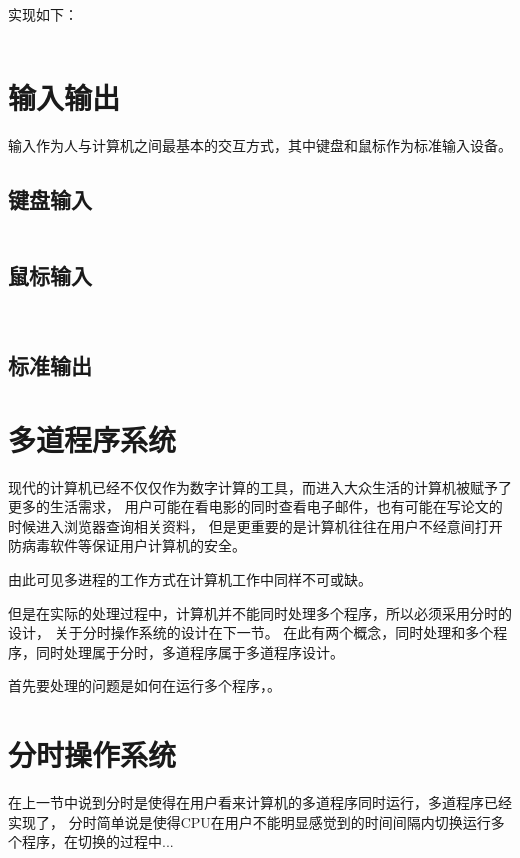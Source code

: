 实现如下：

\begin{listing}[H]
  \inputminted[tabsize=2, firstline=128, lastline=141,
  linenos=true]{c}{../ZOS/src/kernel/memory.c}
\end{listing}

\section{输入输出}

输入作为人与计算机之间最基本的交互方式，其中键盘和鼠标作为标准输入设备。

\subsection{键盘输入}

\begin{listing}[H]
  \inputminted[tabsize=2, firstline=162, lastline=170,
  linenos=true]{c}{../ZOS/src/kernel/bootpack.c}
\end{listing}

\subsection{鼠标输入}

\begin{listing}[H]
  \inputminted[tabsize=2, firstline=247, lastline=265,
  linenos=true]{c}{../ZOS/src/kernel/bootpack.c}
  \inputminted[tabsize=2, firstline=329, lastline=338,
  linenos=true]{c}{../ZOS/src/kernel/bootpack.c}
\end{listing}

\subsection{标准输出}


\section{多道程序系统}

现代的计算机已经不仅仅作为数字计算的工具，而进入大众生活的计算机被赋予了更多的生活需求，
用户可能在看电影的同时查看电子邮件，也有可能在写论文的时候进入浏览器查询相关资料，
但是更重要的是计算机往往在用户不经意间打开防病毒软件等保证用户计算机的安全\cite{tanenbaum2009modern}。

由此可见多进程的工作方式在计算机工作中同样不可或缺。

但是在实际的处理过程中，计算机并不能同时处理多个程序，所以必须采用分时的设计，
关于分时操作系统的设计在下一节。
在此有两个概念，同时处理和多个程序，同时处理属于分时，多道程序属于多道程序设计。

首先要处理的问题是如何在运行多个程序，。

\section{分时操作系统}

在上一节中说到分时是使得在用户看来计算机的多道程序同时运行，多道程序已经实现了，
分时简单说是使得CPU在用户不能明显感觉到的时间间隔内切换运行多个程序，在切换的过程中...
